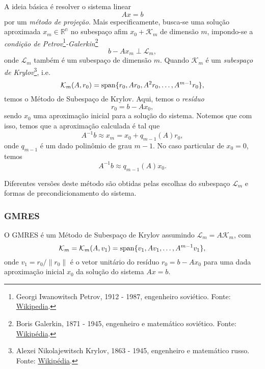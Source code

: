 A ideia básica é resolver o sistema linear
\begin{equation}
  Ax = b
\end{equation}
por um \emph{método de projeção}. Mais especificamente, busca-se uma solução aproximada $x_m\in\mathbb{R^n}$ no subespaço afim $x_0 + \mathcal{K}_m$ de dimensão $m$, impondo-se a \emph{condição de Petrov}\footnote{Georgi Iwanowitsch Petrov, 1912 - 1987, engenheiro soviético. Fonte: \href{https://de.wikipedia.org/wiki/Georgi_Iwanowitsch_Petrow}{Wikipedia}.}\emph{-Galerkin}\footnote{Boris Galerkin, 1871 - 1945, engenheiro e matemático soviético. Fonte: \href{https://pt.wikipedia.org/wiki/Boris_Galerkin}{Wikipédia}.}
\begin{equation}
  b - Ax_m \perp \mathcal{L}_m,
\end{equation}
onde $\mathcal{L}_m$ também é um subespaço de dimensão $m$. Quando $\mathcal{K}_m$ é um \emph{subespaço de Krylov}\footnote{Alexei Nikolajewitsch Krylov, 1863 - 1945, engenheiro e matemático russo. Fonte: \href{https://pt.wikipedia.org/wiki/Alexei_Krylov}{Wikipédia}.}, i.e.
\begin{equation}
  \mathcal{K}_m(A,r_0) = \operatorname{span}\{r_0, Ar_0, A^2r_0,\dotsc,A^{m-1}r_0\},
\end{equation}
temos o Método de Subespaço de Krylov. Aqui, temos o \emph{resíduo}
\begin{equation}
  r_0 = b - Ax_0,
\end{equation}
sendo $x_0$ uma aproximação inicial para a solução do sistema. Notemos que com isso, temos que a aproximação calculada é tal que
\begin{equation}
  A^{-1}b \approx x_m = x_0 + q_{m-1}(A)r_0,
\end{equation}
onde $q_{m-1}$ é um dado polinômio de grau $m-1$. No caso particular de $x_0 = 0$, temos
\begin{equation}
  A^{-1}b \approx q_{m-1}(A)x_0.
\end{equation}

Diferentes versões deste método são obtidas pelas escolhas do subespaço $\mathcal{L}_m$ e formas de precondicionamento do sistema.

\subsubsection{GMRES}

O GMRES é um Método de Subespaço de Krylov assumindo $\mathcal{L}_m = A\mathcal{K}_m$, com
\begin{equation}
  \mathcal{K}_m = \mathcal{K}_m(A,v_1) = \operatorname{span}\{v_1, Av_1, \dotsc, A^{m-1}v_1\},
\end{equation}
onde $v_1 = r_0/\|r_0\|$ é o vetor unitário do resíduo $r_0 = b - Ax_0$ para uma dada aproximação inicial $x_0$ da solução do sistema $Ax = b$.


